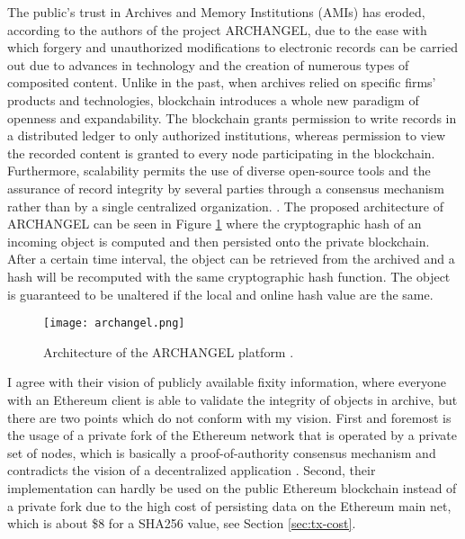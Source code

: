 The public's trust in Archives and Memory Institutions (AMIs) has eroded, according to the authors of the project ARCHANGEL, due to the ease with which forgery and unauthorized modifications to electronic records can be carried out due to advances in technology and the creation of numerous types of composited content. Unlike in the past, when archives relied on specific firms' products and technologies, blockchain introduces a whole new paradigm of openness and expandability. The blockchain grants permission to write records in a distributed ledger to only authorized institutions, whereas permission to view the recorded content is granted to every node participating in the blockchain. Furthermore, scalability permits the use of diverse open-source tools and the assurance of record integrity by several parties through a consensus mechanism rather than by a single centralized organization. \cite[4]{wang2021research}.
The proposed architecture of ARCHANGEL can be seen in Figure \ref{fig:archangel} where the cryptographic hash of an incoming object is computed and then persisted onto the private blockchain. After a certain time interval, the object can be retrieved from the archived and a hash will be recomputed with the same cryptographic hash function. The object is guaranteed to be unaltered if the local and online hash value are the same.
\begin{figure}[t]
    \centering
    \texttt{[image: archangel.png]}
    \caption{Architecture of the ARCHANGEL platform \cite[2]{collomosse2018archangel}.}
    \label{fig:archangel}
\end{figure}
I agree with their vision of publicly available fixity information, where everyone with an Ethereum client is able to validate the integrity of objects in archive, but there are two points which do not conform with my vision. First and foremost is the usage of a private fork of the Ethereum network that is operated by a private set of nodes, which is basically a proof-of-authority consensus mechanism and contradicts the vision of a decentralized application \cite[3]{collomosse2018archangel}. Second, their implementation can hardly be used on the public Ethereum blockchain instead of a private fork due to the high cost of persisting data on the Ethereum main net, which is about \$8 for a SHA256 value, see Section \ref{sec:tx-cost}. 

